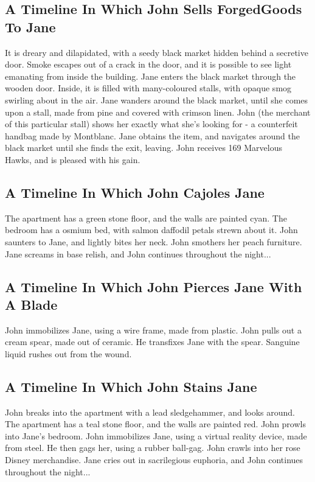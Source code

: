 \documentclass{article}
\begin{document}
\subsection{A Timeline In Which John Sells ForgedGoods To Jane}


It is dreary and dilapidated, with a seedy black market hidden behind a secretive door.
Smoke escapes out of a crack in the door, and it is possible to see light emanating from inside the building.
Jane enters the black market through the wooden door.
Inside, it is filled with many{-}coloured stalls, with opaque smog swirling about in the air.
Jane wanders around the black market, until she comes upon a stall, made from pine and covered with crimson linen.
John (the merchant of this particular stall) shows her exactly what she's looking for {-} a counterfeit handbag made by Montblanc.
Jane obtains the item, and navigates around the black market until she finds the exit, leaving.
John receives 169 Marvelous Hawks, and is pleased with his gain.
\subsection{A Timeline In Which John Cajoles Jane}


The apartment has a green stone floor, and the walls are painted cyan.
The bedroom has a osmium bed, with salmon daffodil petals strewn about it.
John saunters to Jane, and lightly bites her neck.
John smothers her peach furniture.
Jane screams in base relish, and John continues throughout the night...
\subsection{A Timeline In Which John Pierces Jane With A Blade}


John immobilizes Jane, using a wire frame, made from plastic.
John pulls out a cream spear, made out of ceramic.
He transfixes Jane with the spear.
Sanguine liquid rushes out from the wound.
\subsection{A Timeline In Which John Stains Jane}


John breaks into the apartment with a lead sledgehammer, and looks around.
The apartment has a teal stone floor, and the walls are painted red.
John prowls into Jane's bedroom.
John immobilizes Jane, using a virtual reality device, made from steel.
He then gags her, using a rubber ball{-}gag.
John crawls into her rose Disney merchandise.
Jane cries out in sacrilegious euphoria, and John continues throughout the night...
\end{document}
